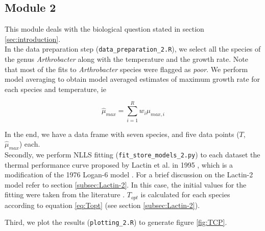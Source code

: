 \documentclass[titlepage,11pt]{article}
\begin{document}
\begin{linenumbers}
		\subsection{Module 2}
		This module deals with the biological question stated in section \ref{sec:introduction}. \\
		In the data preparation step (\verb|data_preparation_2.R|), we select all the species of the genus \textit{Arthrobacter} along with the temperature and the growth rate. Note that most of the fits to \textit{Arthrobacter} species were flagged as \textit{poor}. We perform model averaging to obtain model averaged estimates of maximum growth rate for each species and temperature, ie
		\begin{linenomath*}
			\begin{equation}
				\hat{\mu}_{max} = \sum\limits_{i = 1}^{R} w_i\mu_{max, i}
			\end{equation}
		\end{linenomath*}
		In the end, we have a data frame with seven species, and five data points ($ T $, $ \hat{\mu}_{max} $) each. \\
		Secondly, we perform NLLS fitting (\verb|fit_store_models_2.py|) to each dataset the thermal performance curve proposed by Lactin et al. in 1995 \cite{Lactin1995}, which is a modification of the 1976 Logan-6 model \cite{Logan1976}. For a brief discussion on the Lactin-2 model refer to section \ref{subsec:Lactin-2}. In this case, the initial values for the fitting were taken from the literature \cite{Lactin1995}. $ T_{opt} $ is calculated for each species according to equation \ref{eq:Topt} (see section \ref{subsec:Lactin-2}). 
		
		Third, we plot the results (\verb|plotting_2.R|) to generate figure \ref{fig:TCP}.

\end{linenumbers}
\end{document}
